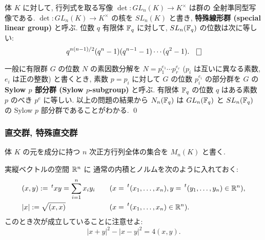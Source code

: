 \documentclass[12pt,twoside]{jarticle}
\begin{document}

\begin{question}[特殊線形群]
  体 $K$ に対して, 行列式を取る写像 $\det:GL_n(K)\to K^\times$ は群の
  全射準同型写像である. $\det:GL_n(K)\to K^\times$ の核を $SL_n(K)$ と書き, 
  {\bf 特殊線形群 (special linear group)} と呼ぶ.
  位数 $q$ 有限体 ${\mathbb F}_q$ に対して, $SL_n({\mathbb F}_q)$ の位数は次に等しい:
  \begin{equation*}
    q^{n(n-1)/2} (q^n-1)(q^{n-1}-1)\cdots(q^2-1). \qed
  \end{equation*}
\end{question}

\begin{rem}
 一般に有限群 $G$ の位数 $N$ の素因数分解を $N=p_1^{e_1}\cdots p_r^{e_r}$ 
 ($p_i$ は互いに異なる素数, $e_i$ は正の整数) と書くとき, 
 素数 $p=p_i$ に対して $G$ の位数 $p_i^{e_i}$ の部分群を $G$ 
 の {\bf Sylow $p$ 部分群 (Sylow $p$-subgroup)} と呼ぶ.
 有限体 ${\mathbb F}_q$ の位数 $q$ はある素数 $p$ のべき $p^e$ に等しい.
 以上の問題の結果から $N_n({\mathbb F}_q)$ は $GL_n({\mathbb F}_q)$ と $SL_n({\mathbb F}_q)$ 
 の Sylow $p$ 部分群であることがわかる.
 \qed
\end{rem}


\subsubsection{直交群, 特殊直交群}

体 $K$ の元を成分に持つ $n$ 次正方行列全体の集合を $M_n(K)$ と書く.


実縦ベクトルの空間 ${\mathbb R}^n$ に
通常の内積とノルムを次のように入れておく:
\begin{alignat*}{2}
  &
  (x,y) := \tp{x}y = \sum_{i=1}^n x_i y_i 
  & &
  \quad (x=\tp{(x_1,\dots,x_n)}, y=\tp{(y_1,\dots,y_n)}\in\R^n),
  \\ &
  |x| := \sqrt{(x,x)} 
  & &
  \quad (x=\tp{(x_1,\dots,x_n)}\in\R^n).
\end{alignat*}
このとき次が成立していることに注意せよ:
\begin{equation*}
 |x+y|^2 - |x-y|^2 = 4(x,y).
\end{equation*}
\end{document}
